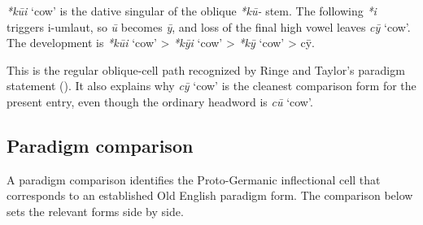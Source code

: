 \documentclass[
  british,
  a4paper,
  openany]{book}
\providecommand{\Recon}[1]{\emph{*#1}}
{\catcode`→=\active \global\def→{\ensuremath{\rightarrow}}}
\providecommand{\Recon}[1]{\emph{*#1}}
{\catcode`→=\active \global\def→{\ensuremath{\rightarrow}}}
\begin{document}
\Recon{kūi} `cow' is the dative singular of the oblique \emph{*kū-}
stem. The following \emph{*i} triggers i-umlaut, so \emph{ū} becomes
\emph{ȳ}, and loss of the final high vowel leaves {\emph{cȳ}} `cow'. The
development is \Recon{kūi} `cow' \textgreater{} \Recon{kȳi} `cow'
\textgreater{} \Recon{kȳ} `cow' \textgreater{} cȳ.

This is the regular oblique-cell path recognized by Ringe and Taylor's
paradigm statement (). It also explains why {\emph{cȳ}} `cow' is the
cleanest comparison form for the present entry, even though the ordinary
headword is {\emph{cū}} `cow'.

\subsection{Paradigm comparison}\label{paradigm-comparison-3}

A paradigm comparison identifies the Proto-Germanic inflectional cell
that corresponds to an established Old English paradigm form. The
comparison below sets the relevant forms side by side.
\end{document}
